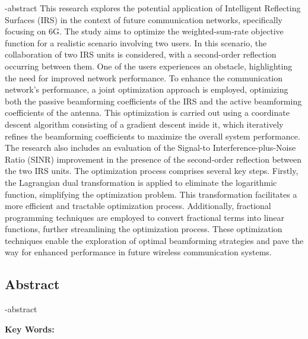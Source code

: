
\en-abstract{
This research explores the potential application of Intelligent Reflecting Surfaces (IRS) in the context of future communication networks, specifically focusing on 6G.
The study aims to optimize the weighted-sum-rate objective function for a realistic scenario involving two users.
In this scenario, the collaboration of two IRS units is considered, with a second-order reflection occurring between them.
One of the users experiences an obstacle, highlighting the need for improved network performance.
To enhance the communication network’s performance, a joint optimization approach is employed, optimizing both the passive beamforming coefficients of the IRS and the active beamforming coefficients of the antenna.
This optimization is carried out using a coordinate descent algorithm consisting of a gradient descent inside it, which iteratively refines the beamforming coefficients to maximize the overall system performance. 
The research also includes an evaluation of the Signal-to Interference-plus-Noise Ratio (SINR) improvement in the presence of the second-order reflection between the two IRS units.
The optimization process comprises several key steps.
Firstly, the Lagrangian dual transformation is applied to eliminate the logarithmic function, simplifying the optimization problem.
This transformation facilitates a more efficient and tractable optimization process.
Additionally, fractional programming techniques are employed to convert fractional terms into linear functions, further streamlining the optimization process.
These optimization techniques enable the exploration of optimal beamforming strategies and pave the way for enhanced performance in future wireless communication systems.
}

\newpage
\thispagestyle{empty}
\begin{latin}
\section*{\LARGE\centering Abstract}

\een-abstract

\vspace*{.5cm}
{\large\textbf{Key Words:}}\par
\vspace*{.5cm}
\elatinkeywords
\end{latin}